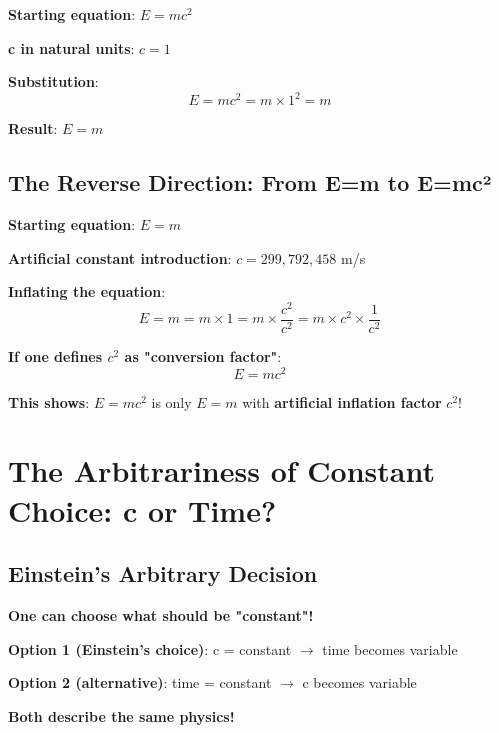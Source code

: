 \documentclass[12pt,a4paper]{article}
\begin{document}
	\textbf{Starting equation}: $E = mc^2$
	
	\textbf{c in natural units}: $c = 1$
	
	\textbf{Substitution}:
	\begin{equation}
		E = mc^2 = m \times 1^2 = m
	\end{equation}
	
	\textbf{Result}: $E = m$
	
	\subsection{The Reverse Direction: From E=m to E=mc²}
	
	\textbf{Starting equation}: $E = m$
	
	\textbf{Artificial constant introduction}: $c = 299,792,458$ m/s
	
	\textbf{Inflating the equation}:
	\begin{equation}
		E = m = m \times 1 = m \times \frac{c^2}{c^2} = m \times c^2 \times \frac{1}{c^2}
	\end{equation}
	
	\textbf{If one defines $c^2$ as "conversion factor"}:
	\begin{equation}
		E = mc^2
	\end{equation}
	
	\textbf{This shows}: $E = mc^2$ is only $E = m$ with \textbf{artificial inflation factor} $c^2$!
	
	\section{The Arbitrariness of Constant Choice: c or Time?}
	
	\subsection{Einstein's Arbitrary Decision}
	
	\begin{tcolorbox}[colback=orange!5!white,colframe=orange!75!black,title=The Fundamental Choice Option]
		\textbf{One can choose what should be "constant"!}
		
		\textbf{Option 1 (Einstein's choice)}: c = constant $\rightarrow$ time becomes variable
		
		\textbf{Option 2 (alternative)}: time = constant $\rightarrow$ c becomes variable
		
		\textbf{Both describe the same physics!}
	\end{tcolorbox}
	
\end{document}
